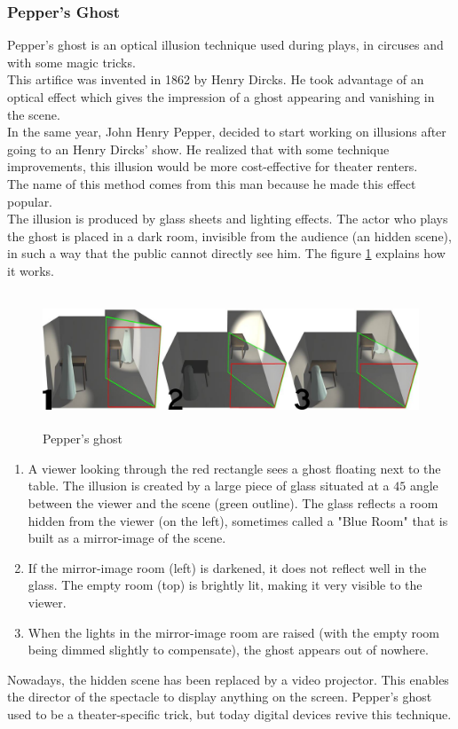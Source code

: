 \subsubsection{Pepper's Ghost}
Pepper's ghost is an optical illusion technique used during plays, in circuses and with some magic tricks.\\
This artifice was invented in 1862 by Henry Dircks. He took advantage of an optical effect which gives the impression of a ghost appearing and vanishing in the scene.\\
In the same year, John Henry Pepper, decided to start working on illusions after going to an Henry Dircks' show. He realized that with some technique improvements, this illusion would be more cost-effective for theater renters.\\
The name of this method comes from this man because he made this effect popular.\\

The illusion is produced by glass sheets and lighting effects. The actor who plays the ghost is placed in a dark room, invisible from the audience (an hidden scene), in such a way that the public cannot directly see him\cite{Peppers-ghost}. 
The figure \ref{fig:pepperghost} explains how it works.

\begin{figure}[h!]
\centering
\includegraphics[width=14cm,height=4cm]{image/peppersG.jpg}
\caption{Pepper's ghost}
\label{fig:pepperghost}
\end{figure}

\begin{enumerate}
\item A viewer looking through the red rectangle sees a ghost floating next to the table. The illusion is created by a large piece of glass situated at a $45$\textdegree{} angle between the viewer and the scene (green outline). The glass reflects a room hidden from the viewer (on the left), sometimes called a "Blue Room" that is built as a mirror-image of the scene.
\item If the mirror-image room (left) is darkened, it does not reflect well in the glass. The empty room (top) is brightly lit, making it very visible to the viewer.
\item  When the lights in the mirror-image room are raised (with the empty room being dimmed slightly to compensate), the ghost appears out of nowhere.
\end{enumerate}

Nowadays, the hidden scene has been replaced by a video projector. This enables the director of the spectacle to display anything on the screen. Pepper's ghost used to be a theater-specific trick, but today digital devices revive this technique.